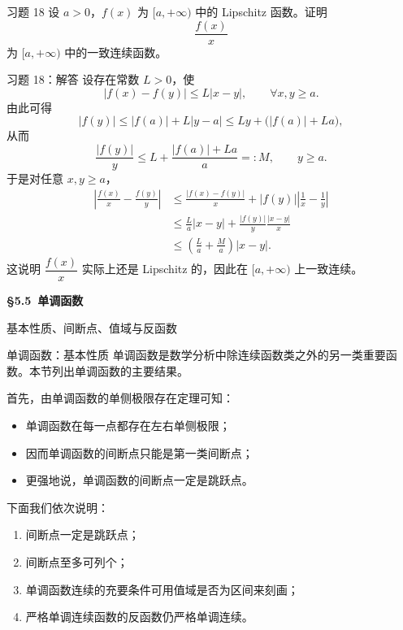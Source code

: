 ﻿\documentclass[aspectratio=169,11pt]{ctexbeamer}
\begin{document}
\begin{frame}{习题 18}
设 $a>0$，$f(x)$ 为 $[a,+\infty)$ 中的 Lipschitz 函数。证明
\[
  \frac{f(x)}{x}
\]
为 $[a,+\infty)$ 中的一致连续函数。
\end{frame}

\begin{frame}[allowframebreaks]{习题 18：解答}
设存在常数 $L>0$，使
\[
  |f(x)-f(y)|\le L|x-y|,\qquad \forall x,y\ge a.
\]
由此可得
\[
  |f(y)|\le |f(a)|+L|y-a|\le Ly+\bigl(|f(a)|+La\bigr),
\]
从而
\[
  \frac{|f(y)|}{y}\le L+\frac{|f(a)|+La}{a}=:M,\qquad y\ge a.
\]
于是对任意 $x,y\ge a$，
\begin{align*}
  \left|\frac{f(x)}{x}-\frac{f(y)}{y}\right|
  &\le \frac{|f(x)-f(y)|}{x}+|f(y)|\left|\frac1x-\frac1y\right| \\
  &\le \frac{L}{a}|x-y|+\frac{|f(y)|}{y}\frac{|x-y|}{x} \\
  &\le \left(\frac{L}{a}+\frac{M}{a}\right)|x-y|.
\end{align*}
这说明 $\dfrac{f(x)}{x}$ 实际上还是 Lipschitz 的，因此在 $[a,+\infty)$ 上一致连续。
\end{frame}

\begin{frame}
  \centering
  \vspace{1.2cm}
  {\LARGE \bfseries \S5.5\ 单调函数}
  \vspace{0.8cm}

  {\large 基本性质、间断点、值域与反函数}
\end{frame}

\begin{frame}{单调函数：基本性质}
单调函数是数学分析中除连续函数类之外的另一类重要函数。本节列出单调函数的主要结果。
\vspace{0.6em}

首先，由单调函数的单侧极限存在定理可知：
\begin{itemize}
  \item 单调函数在每一点都存在左右单侧极限；
  \item 因而单调函数的间断点只能是第一类间断点；
  \item 更强地说，单调函数的间断点一定是跳跃点。
\end{itemize}
\vspace{0.5em}

下面我们依次说明：
\begin{enumerate}
  \item 间断点一定是跳跃点；
  \item 间断点至多可列个；
  \item 单调函数连续的充要条件可用值域是否为区间来刻画；
  \item 严格单调连续函数的反函数仍严格单调连续。
\end{enumerate}
\end{frame}
\end{document}
